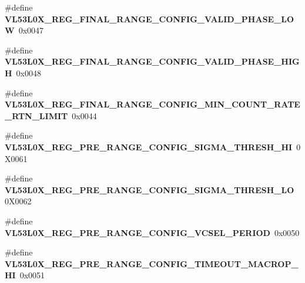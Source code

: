 \begin{DoxyCompactItemize}
\#define {\bfseries V\+L53\+L0\+X\+\_\+\+R\+E\+G\+\_\+\+F\+I\+N\+A\+L\+\_\+\+R\+A\+N\+G\+E\+\_\+\+C\+O\+N\+F\+I\+G\+\_\+\+V\+A\+L\+I\+D\+\_\+\+P\+H\+A\+S\+E\+\_\+\+L\+OW}~0x0047
\item 
\mbox{\label{group__VL53L0X__DefineRegisters__group_ga78de2e1eff30cf5524ecb8e7c5872ec8}} 
\#define {\bfseries V\+L53\+L0\+X\+\_\+\+R\+E\+G\+\_\+\+F\+I\+N\+A\+L\+\_\+\+R\+A\+N\+G\+E\+\_\+\+C\+O\+N\+F\+I\+G\+\_\+\+V\+A\+L\+I\+D\+\_\+\+P\+H\+A\+S\+E\+\_\+\+H\+I\+GH}~0x0048
\item 
\mbox{\label{group__VL53L0X__DefineRegisters__group_ga213342203509c20850a6d4da2c1a7623}} 
\#define {\bfseries V\+L53\+L0\+X\+\_\+\+R\+E\+G\+\_\+\+F\+I\+N\+A\+L\+\_\+\+R\+A\+N\+G\+E\+\_\+\+C\+O\+N\+F\+I\+G\+\_\+\+M\+I\+N\+\_\+\+C\+O\+U\+N\+T\+\_\+\+R\+A\+T\+E\+\_\+\+R\+T\+N\+\_\+\+L\+I\+M\+IT}~0x0044
\item 
\mbox{\label{group__VL53L0X__DefineRegisters__group_ga058e412f106a41a50c1197b524d6c8b5}} 
\#define {\bfseries V\+L53\+L0\+X\+\_\+\+R\+E\+G\+\_\+\+P\+R\+E\+\_\+\+R\+A\+N\+G\+E\+\_\+\+C\+O\+N\+F\+I\+G\+\_\+\+S\+I\+G\+M\+A\+\_\+\+T\+H\+R\+E\+S\+H\+\_\+\+HI}~0\+X0061
\item 
\mbox{\label{group__VL53L0X__DefineRegisters__group_ga510287573886507b682549c4119130d2}} 
\#define {\bfseries V\+L53\+L0\+X\+\_\+\+R\+E\+G\+\_\+\+P\+R\+E\+\_\+\+R\+A\+N\+G\+E\+\_\+\+C\+O\+N\+F\+I\+G\+\_\+\+S\+I\+G\+M\+A\+\_\+\+T\+H\+R\+E\+S\+H\+\_\+\+LO}~0\+X0062
\item 
\mbox{\label{group__VL53L0X__DefineRegisters__group_ga07f2f6af1daf22f551b2d10fce8709f2}} 
\#define {\bfseries V\+L53\+L0\+X\+\_\+\+R\+E\+G\+\_\+\+P\+R\+E\+\_\+\+R\+A\+N\+G\+E\+\_\+\+C\+O\+N\+F\+I\+G\+\_\+\+V\+C\+S\+E\+L\+\_\+\+P\+E\+R\+I\+OD}~0x0050
\item 
\mbox{\label{group__VL53L0X__DefineRegisters__group_ga399c03cf46210a004e2e160aeaf69fee}} 
\#define {\bfseries V\+L53\+L0\+X\+\_\+\+R\+E\+G\+\_\+\+P\+R\+E\+\_\+\+R\+A\+N\+G\+E\+\_\+\+C\+O\+N\+F\+I\+G\+\_\+\+T\+I\+M\+E\+O\+U\+T\+\_\+\+M\+A\+C\+R\+O\+P\+\_\+\+HI}~0x0051

\end{DoxyCompactItemize}
